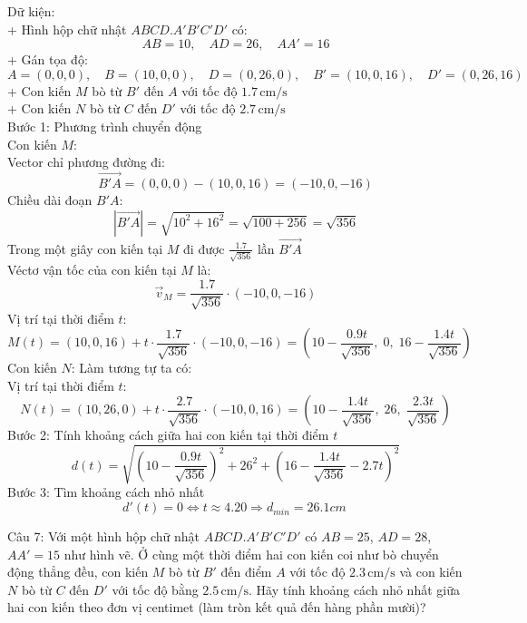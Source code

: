 \documentclass[a4paper,12pt]{article}
\begin{document}
Dữ kiện:\\
+ Hình hộp chữ nhật \(ABCD.A'B'C'D'\) có:\\
\[
AB = 10,\quad AD = 26,\quad AA' = 16
\]
+ Gán tọa độ:
\[
A = (0, 0, 0),\quad B = (10, 0, 0),\quad D = (0, 26, 0),\quad B' = (10, 0, 16),\quad D' = (0, 26, 16)
\]
+ Con kiến \(M\) bò từ \(B'\) đến \(A\) với tốc độ \(1.7\, \text{cm/s}\)\\
+ Con kiến \(N\) bò từ \(C\) đến \(D'\) với tốc độ \(2.7\, \text{cm/s}\)\\
Bước 1: Phương trình chuyển động\\
Con kiến \(M\):\\
Vector chỉ phương đường đi:
\[
\overrightarrow{B'A} = (0, 0, 0) - (10, 0, 16) = ( -10, 0, -16 )
\]
Chiều dài đoạn \(B'A\):
\[
|\overrightarrow{B'A}| = \sqrt{10^2 + 16^2} = \sqrt{100 + 256} = \sqrt{356}
\]
Trong một giây con kiến tại \(M\) đi được \(\frac{1.7}{\sqrt{356}}\) lần \(\overrightarrow{B'A}\)\\
Véctơ vận tốc của con kiến tại \(M\) là:
\[
\overrightarrow{v}_M = \frac{1.7}{\sqrt{356}} \cdot ( -10, 0, -16 )
\]
Vị trí tại thời điểm \(t\):
\[
M(t) = (10, 0, 16) + t \cdot \frac{1.7}{\sqrt{356}} \cdot ( -10, 0, -16 )
= \left( 10 - \frac{0.9t}{\sqrt{356}},\; 0,\; 16 - \frac{1.4t}{\sqrt{356}} \right)
\]
Con kiến \(N\): Làm tương tự ta có:\\
Vị trí tại thời điểm \(t\):
\[
N(t) = (10, 26, 0) + t \cdot \frac{2.7}{\sqrt{356}} \cdot (-10, 0, 16)
= \left( 10 - \frac{1.4t}{\sqrt{356}},\; 26,\; \frac{2.3t}{\sqrt{356}} \right)
\]
Bước 2: Tính khoảng cách giữa hai con kiến tại thời điểm \(t\)
\[
d(t) = \sqrt{\left(10 - \frac{0.9t}{\sqrt{356}}\right)^2 + 26^2 + \left(16 - \frac{1.4t}{\sqrt{356}} - 2.7t\right)^2}
\]
Bước 3: Tìm khoảng cách nhỏ nhất
\[
d'(t)=0\Leftrightarrow t \approx 4.20 \Rightarrow d_{min}=26.1cm\
\]




Câu 7: 
Với một hình hộp chữ nhật \(ABCD.A'B'C'D'\) có \(AB=25\), \(AD=28\), \(AA'=15\) như hình vẽ. Ở cùng một thời điểm hai con kiến coi như bò chuyển động thẳng đều, con kiến \(M\) bò từ \(B'\) đến điểm \(A\) với tốc độ \(2.3\,\mathrm{cm/s}\) và con kiến \(N\) bò từ \(C\) đến \(D'\) với tốc độ bằng \(2.5\,\mathrm{cm/s}\). Hãy tính khoảng cách nhỏ nhất giữa hai con kiến theo đơn vị centimet (làm tròn kết quả đến hàng phần mười)?
\end{document}
